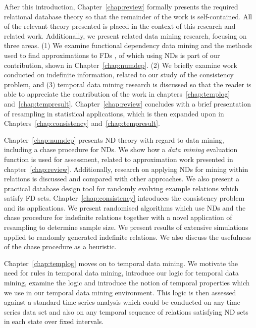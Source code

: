 After this introduction, Chapter~\ref{chap:review} formally presents
the required relational database theory so that the remainder of the
work is self-contained.  All of the relevant theory presented is
placed in the context of this research and related work. Additionally,
we present related data mining research, focusing on three areas. (1)
We examine functional dependency data mining and the methods used to
find approximations to FDs \cite{km95,at94,Mann92,sf93,HS95,pk95,bel95b,psm93}, of which using NDs is part of our
contribution, shown in Chapter~\ref{chap:numdep}. (2) We briefly
examine work conducted on 
indefinite information, related to our study of the consistency
problem, and (3) temporal data mining research is discussed so that
the reader is able to appreciate the contribution of the
work in chapters~\ref{chap:templog}
and~\ref{chap:tempresult}. Chapter~\ref{chap:review} concludes with a
brief presentation of
resampling in statistical applications, which is then expanded upon in
Chapters~\ref{chap:consistency} and~\ref{chap:tempresult}.

\medskip

Chapter~\ref{chap:numdep} presents ND theory with regard to data
mining, including a chase procedure for NDs. We show how a
{\em data mining} evaluation function is used for assessment, related
to approximation work presented in
chapter~\ref{chap:review}. Additionally, research on applying NDs for
mining within relations is discussed and compared with other
approaches. We also present a practical database design tool for randomly
evolving example relations which satisfy FD sets.  Chapter~\ref{chap:consistency} introduces
the consistency problem and its applications. We present randomised
algorithms which use NDs and the chase procedure for indefinite
relations together with a novel application of resampling to determine
sample size. We present results of extensive simulations applied to
randomly generated indefinite relations. We also discuss the
usefulness of the chase procedure as a heuristic.

\medskip

Chapter~\ref{chap:templog} moves on to temporal data mining. We
motivate the need for rules in temporal data mining, introduce our
logic for temporal data mining, examine the logic and introduce the
notion of temporal properties which we use in our temporal data mining
environment. This logic is then assessed against a standard time series
analysis which could be conducted on any time series data set and also
on any temporal sequence of relations satisfying ND sets in each
state over fixed intervals.

